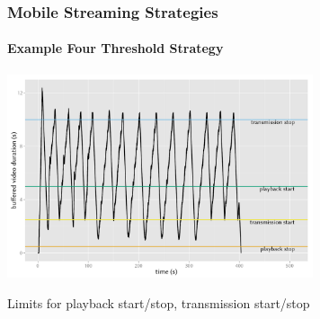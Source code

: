 \documentclass{beamer}
\begin{document}


\begin{frame}
	\frametitle{Mobile Streaming Strategies}
	\framesubtitle{Example Four Threshold Strategy}



		\begin{center}
			\includegraphics[height=6cm]{../../chapters/06-mobilestreamingmeasurements/images/R-ltesim-plotbuffer-time.pdf}

			Limits for playback start/stop, transmission start/stop
		\end{center}
		




\end{frame}



\begin{frame}
\end{frame}
\end{document}
